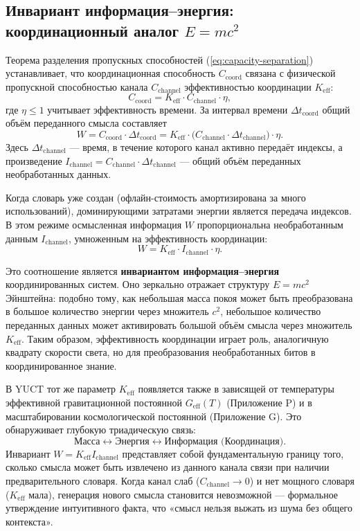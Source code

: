 \documentclass[12pt,a4paper]{article}
\theoremstyle{remark}
\begin{document}
	\subsection{Инвариант информация–энергия: координационный аналог \(E=mc^2\)}
	\label{subsec:info_energy_invariant}
	
	Теорема разделения пропускных способностей (\ref{eq:capacity-separation}) устанавливает, что координационная способность \(C_{\text{coord}}\) связана с физической пропускной способностью канала \(C_{\text{channel}}\) эффективностью координации \(K_{\mathrm{eff}}\):
	\[
	C_{\text{coord}} = K_{\mathrm{eff}} \cdot C_{\text{channel}} \cdot \eta,
	\]
	где \(\eta \le 1\) учитывает эффективность времени. За интервал времени \(\Delta t_{\text{coord}}\) общий объём переданного смысла составляет
	\[
	W = C_{\text{coord}} \cdot \Delta t_{\text{coord}} = K_{\mathrm{eff}} \cdot \bigl( C_{\text{channel}} \cdot \Delta t_{\text{channel}} \bigr) \cdot \eta.
	\]
	Здесь \(\Delta t_{\text{channel}}\) — время, в течение которого канал активно передаёт индексы, а произведение \(I_{\text{channel}} = C_{\text{channel}} \cdot \Delta t_{\text{channel}}\) — общий объём переданных необработанных данных.
	
	Когда словарь уже создан (офлайн-стоимость амортизирована за много использований), доминирующими затратами энергии является передача индексов. В этом режиме осмысленная информация \(W\) пропорциональна необработанным данным \(I_{\text{channel}}\), умноженным на эффективность координации:
	\[
	\boxed{W = K_{\mathrm{eff}} \cdot I_{\text{channel}} \cdot \eta}.
	\]
	
	Это соотношение является \textbf{инвариантом информация–энергия} координированных систем. Оно зеркально отражает структуру \(E = m c^2\) Эйнштейна: подобно тому, как небольшая масса покоя может быть преобразована в большое количество энергии через множитель \(c^2\), небольшое количество переданных данных может активировать большой объём смысла через множитель \(K_{\mathrm{eff}}\). Таким образом, эффективность координации играет роль, аналогичную квадрату скорости света, но для преобразования необработанных битов в координированное знание.
	
	В YUCT тот же параметр \(K_{\mathrm{eff}}\) появляется также в зависящей от температуры эффективной гравитационной постоянной \(G_{\text{eff}}(T)\) (Приложение P) и в масштабировании космологической постоянной (Приложение G). Это обнаруживает глубокую триадическую связь:
	\[
	\text{Масса} \leftrightarrow \text{Энергия} \leftrightarrow \text{Информация (Координация)}.
	\]
	Инвариант \(W = K_{\mathrm{eff}} I_{\text{channel}}\) представляет собой фундаментальную границу того, сколько смысла может быть извлечено из данного канала связи при наличии предварительного словаря. Когда канал слаб (\(C_{\text{channel}} \to 0\)) и нет мощного словаря (\(K_{\mathrm{eff}}\) мала), генерация нового смысла становится невозможной — формальное утверждение интуитивного факта, что «смысл нельзя выжать из шума без общего контекста».
	
\end{document}
